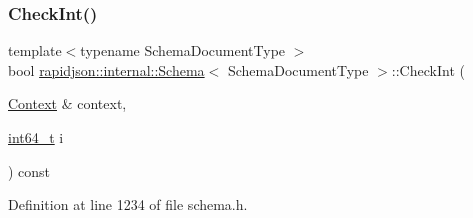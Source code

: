 \subsubsection{\texorpdfstring{CheckInt()}{CheckInt()}}
{\footnotesize\ttfamily template$<$typename Schema\+Document\+Type $>$ \\
bool \mbox{\hyperlink{classrapidjson_1_1internal_1_1_schema}{rapidjson\+::internal\+::\+Schema}}$<$ Schema\+Document\+Type $>$\+::Check\+Int (\begin{DoxyParamCaption}\item[{\mbox{\hyperlink{classrapidjson_1_1internal_1_1_schema_afca06b1f51d1bc18403bdf3f4d55ffef}{Context}} \&}]{context,  }\item[{\mbox{\hyperlink{stdint_8h_a414156feea104f8f75b4ed9e3121b2f6}{int64\+\_\+t}}}]{i }\end{DoxyParamCaption}) const\hspace{0.3cm}{\ttfamily [private]}}



Definition at line 1234 of file schema.\+h.


